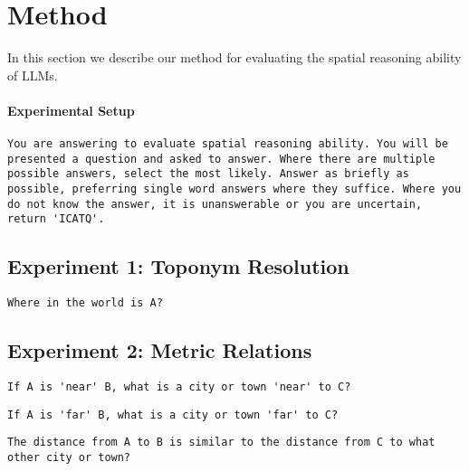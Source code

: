 \section{Method}
\label{section:method}

In this section we describe our method for evaluating the spatial reasoning ability of LLMs.


\paragraph{Experimental Setup}



\begin{lstlisting}[title=text here]
    You are answering to evaluate spatial reasoning ability. You will be presented a question and asked to answer. Where there are multiple possible answers, select the most likely. Answer as briefly as possible, preferring single word answers where they suffice. Where you do not know the answer, it is unanswerable or you are uncertain, return 'ICATQ'.
\end{lstlisting}




\subsection{Experiment 1: Toponym Resolution}

\begin{lstlisting}[title=text here]
    Where in the world is A?
\end{lstlisting}




\subsection{Experiment 2: Metric Relations}

\begin{lstlisting}[title=text here]
    If A is 'near' B, what is a city or town 'near' to C?
\end{lstlisting}

\begin{lstlisting}[title=text here]
    If A is 'far' B, what is a city or town 'far' to C?
\end{lstlisting}

\begin{lstlisting}[title=text here]
    The distance from A to B is similar to the distance from C to what other city or town?
\end{lstlisting}


